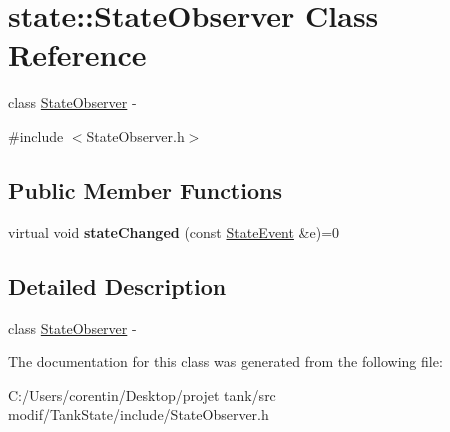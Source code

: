 \hypertarget{classstate_1_1_state_observer}{}\section{state\+:\+:State\+Observer Class Reference}
\label{classstate_1_1_state_observer}


class \hyperlink{classstate_1_1_state_observer}{State\+Observer} -\/  




{\ttfamily \#include $<$State\+Observer.\+h$>$}

\subsection*{Public Member Functions}
\begin{DoxyCompactItemize}
\item 
\mbox{\label{classstate_1_1_state_observer_a2e15f5d73a6e24786fbb40b22785cd99}} 
virtual void {\bfseries state\+Changed} (const \hyperlink{classstate_1_1_state_event}{State\+Event} \&e)=0
\end{DoxyCompactItemize}


\subsection{Detailed Description}
class \hyperlink{classstate_1_1_state_observer}{State\+Observer} -\/ 

The documentation for this class was generated from the following file\+:\begin{DoxyCompactItemize}
\item 
C\+:/\+Users/corentin/\+Desktop/projet tank/src modif/\+Tank\+State/include/State\+Observer.\+h\end{DoxyCompactItemize}

